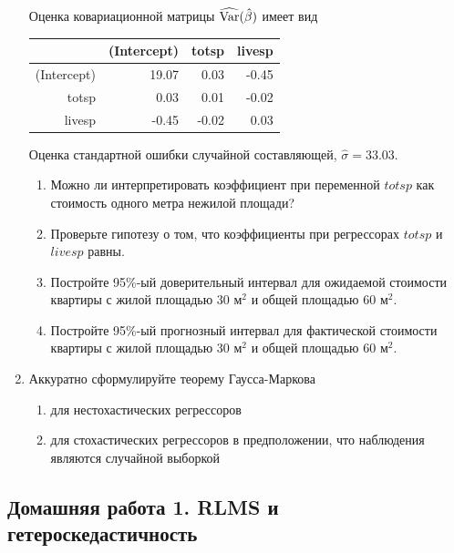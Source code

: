 \documentclass[12pt, a4paper]{article}
\begin{document}
\begin{enumerate}
Оценка ковариационной матрицы $\widehat{\operatorname{Var}}(\hat{\beta})$ имеет вид


\begin{table}[ht]
\centering
\begin{tabular}{rrrr}
  \hline
 & (Intercept) & totsp & livesp \\
  \hline
(Intercept) & 19.07 & 0.03 & -0.45 \\
  totsp & 0.03 & 0.01 & -0.02 \\
  livesp & -0.45 & -0.02 & 0.03 \\
   \hline
\end{tabular}
\end{table}

Оценка стандартной ошибки случайной составляющей, $\hat{\sigma}=33.03$.

\begin{enumerate}
\item Можно ли интерпретировать коэффициент при переменной $totsp$ как стоимость одного метра нежилой площади?
\item Проверьте гипотезу о том, что коэффициенты при регрессорах $totsp$ и $livesp$ равны.
\item Постройте 95\%-ый доверительный интервал для ожидаемой стоимости квартиры с жилой площадью $30$ м$^2$ и общей площадью $60$ м$^2$.
\item Постройте 95\%-ый прогнозный интервал для фактической стоимости квартиры с жилой площадью $30$ м$^2$ и общей площадью $60$ м$^2$.
\end{enumerate}

\item Аккуратно сформулируйте теорему Гаусса-Маркова
\begin{enumerate}
\item для нестохастических регрессоров
\item для стохастических регрессоров в предположении, что наблюдения являются случайной выборкой
\end{enumerate}




\end{enumerate}



\subsection{Домашняя работа 1. RLMS и гетероскедастичность}
\end{document}
